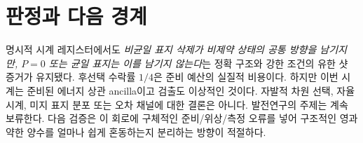 \documentclass[11pt,a4paper]{article}
\begin{document}
\section{판정과 다음 경계}
명시적 시계 레지스터에서도 \emph{비균일 표지 삭제가 비제약
상태의 공통 방향을 남기지만, $P=0$ 또는 균일 표지는 이를
남기지 않는다}는 정확 구조와 강한 조건의 유한 샷 증거가
유지됐다. 후선택 수락률 $1/4$은 준비 예산의 실질적 비용이다.
하지만 이번 시계는 준비된 에너지 상관 ancilla이고 검출도
이상적인 것이다. 자발적 차원 선택, 자율 시계, 미지 표지
분포 또는 오차 채널에 대한 결론은 아니다. 발전연구의
주제는 계속 보류한다. 다음 검증은 이 회로에 구체적인
준비/위상/측정 오류를 넣어 구조적인 영과 약한 양수를
얼마나 쉽게 혼동하는지 분리하는 방향이 적절하다.
\end{document}
